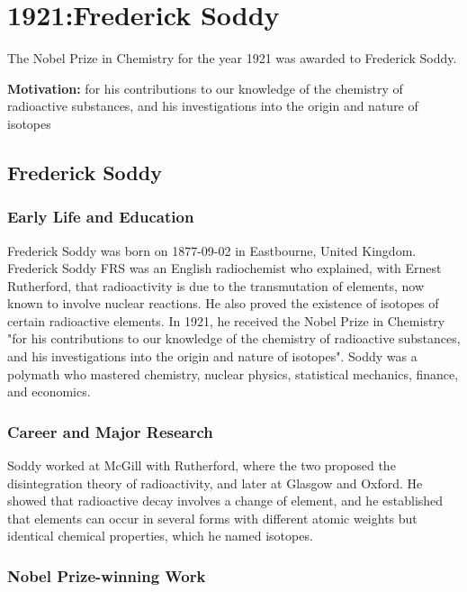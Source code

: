 \chapter{1921:Frederick Soddy}
\label{chap:chemistry1921}

The Nobel Prize in Chemistry for the year 1921 was awarded to Frederick Soddy.

\textbf{Motivation:}
for his contributions to our knowledge of the chemistry of radioactive substances, and his investigations into the origin and nature of isotopes

\section{Frederick Soddy}

\subsection*{Early Life and Education}

Frederick Soddy was born on 1877-09-02 in Eastbourne, United Kingdom.
Frederick Soddy FRS was an English radiochemist who explained, with Ernest Rutherford, that radioactivity is due to the transmutation of elements, now known to involve nuclear reactions. He also proved the existence of isotopes of certain radioactive elements. In 1921, he received the Nobel Prize in Chemistry "for his contributions to our knowledge of the chemistry of radioactive substances, and his investigations into the origin and nature of isotopes". Soddy was a polymath who mastered chemistry, nuclear physics, statistical mechanics, finance, and economics.

\subsection*{Career and Major Research}

Soddy worked at McGill with Rutherford, where the two proposed the disintegration theory of radioactivity, and later at Glasgow and Oxford. He showed that radioactive decay involves a change of element, and he established that elements can occur in several forms with different atomic weights but identical chemical properties, which he named isotopes.

\subsection*{Nobel Prize-winning Work}

